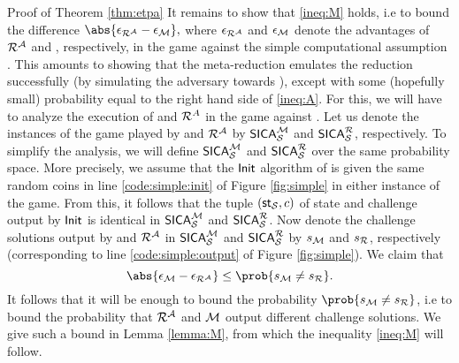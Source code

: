 \begin{namedproof}{Proof of Theorem \ref{thm:etpa}}
  It remains to show that \eqref{ineq:M} holds, i.e to bound the difference
  \(
    \abs{\epsilon_{\redR^{\advA}} - \epsilon_{\redM}},
  \)
  where \(\epsilon_{\redR^{\advA}}\) and \(\epsilon_{\mathcal{M}}\) denote
  the advantages of \(\redR^{\advA}\) and \redM, respectively, in the game \SICA
  against the simple computational assumption \Simple.
  This amounts to showing that the meta-reduction \redM
  emulates the reduction \redR successfully
  (by simulating the adversary \advA towards \redR),
  except with some (hopefully small) probability equal to the right hand side of \eqref{ineq:A}.
  For this, we will have to analyze the execution of \redM and \(\redR^{A}\)
  in the game \SICA against \Simple.
  Let us denote the instances of the \SICA game played by \redM and \(\redR^{\advA}\)
  by \(\mathsf{SICA}_{\mathcal{S}}^{\mathcal{M}}\) and \(\SICA_{\Simple}^{\redR}\), respectively.
  To simplify the analysis, we will define \(\mathsf{SICA}_{\mathcal{S}}^{\mathcal{M}}\)
  and \(\SICA_{\Simple}^{\redR}\) over the same probability space.
  More precisely, we assume that the \(\mathsf{Init}\) algorithm of \Simple
  is given the same random coins in line \ref{code:simple:init} of Figure \ref{fig:simple}
  in either instance of the \SICA game.
  From this, it follows that the tuple \((\mathsf{st}_{\mathcal{S}},c)\) of state and challenge
  output by \(\mathsf{Init}\) is identical in \(\mathsf{SICA}_{\mathcal{S}}^{\mathcal{M}}\) and \(\SICA_{\Simple}^{\redR}\).
  Now denote the challenge solutions output by \redM and \(\redR^{\advA}\)
  in \(\mathsf{SICA}_{\mathcal{S}}^{\mathcal{M}}\) and \(\SICA_{\Simple}^{\redR}\)
  by \(s_{\mathcal{M}}\) and \(s_{\redR}\), respectively (corresponding to line \ref{code:simple:output} of Figure \ref{fig:simple}).
  We claim that
  \begin{equation}\label{ineq:owecpa:diff}
    \abs{\epsilon_{\redM} - \epsilon_{\redR^{\advA}}} \le \prob{s_{\redM} \ne s_{\redR}}.
  \end{equation}
  It follows that it will be enough to bound the probability \(\prob{s_{\redM} \ne s_{\redR}}\),
  i.e to bound the probability that \(\redR^{\advA}\) and \(\mathcal{M}\)
  output different challenge solutions.
  We give such a bound in Lemma \ref{lemma:M}, from which the inequality \eqref{ineq:M} will follow.


\end{namedproof}
